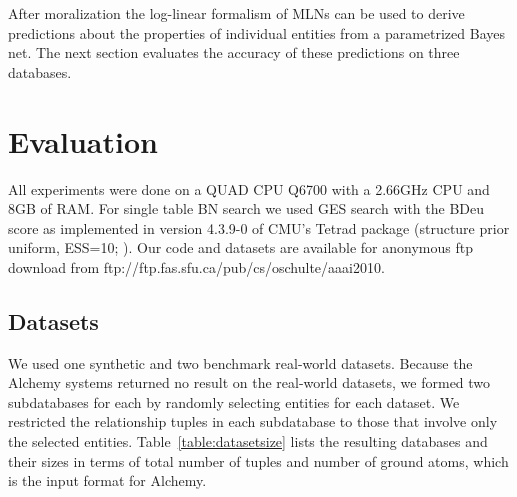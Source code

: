 \documentclass[letterpaper]{article}
\begin{document}
After moralization the log-linear formalism of MLNs can be used to derive predictions about the properties of individual entities from a parametrized Bayes net. The next section evaluates the accuracy of these predictions on three databases. 


\section{Evaluation}
All experiments were done on a QUAD CPU Q6700 with a 2.66GHz CPU and 8GB of RAM. For single table BN search we used GES search \cite{Chickering2003} with the BDeu score as implemented in version 4.3.9-0 of CMU's Tetrad package (structure prior uniform, ESS=10; \cite{2008a}). Our code and datasets are available for anonymous ftp download from ftp://ftp.fas.sfu.ca/pub/cs/oschulte/aaai2010. 

\subsection{Datasets}
We used one synthetic and two benchmark real-world datasets. Because the Alchemy systems returned no result on the real-world datasets, we formed two subdatabases for each by randomly selecting entities for each dataset. We restricted the relationship tuples in each subdatabase to those that involve only the selected entities. Table~\ref{table:datasetsize} lists the resulting databases and their sizes in terms of total number of tuples and number of ground atoms, which is the input format for Alchemy. 
\end{document}
